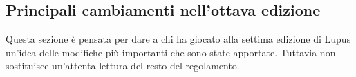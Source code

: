 \documentclass[a4paper,10pt]{article}
\begin{document}

\subsection{Principali cambiamenti nell'ottava edizione} %

Questa sezione è pensata per dare a chi ha giocato alla settima edizione di Lupus un'idea delle modifiche più importanti che sono state apportate. Tuttavia non sostituisce un'attenta lettura del resto del regolamento.
\end{document}
